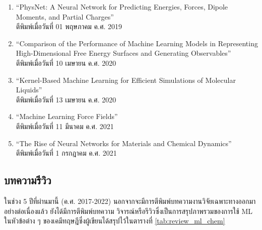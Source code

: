 \begin{enumerate}
    \item \enquote{PhysNet: A Neural Network for Predicting Energies, Forces, Dipole Moments, and 
    Partial Charges}\autocite{unke2019}\\
    ตีพิมพ์เมื่อวันที่ 01 พฤษภาคม ค.ศ. 2019
    
    \item \enquote{Comparison of the Performance of Machine Learning Models in Representing High-Dimensional 
    Free Energy Surfaces and Generating Observables}\autocite{cendagorta2020}\\
    ตีพิมพ์เมื่อวันที่ 10 เมษายน ค.ศ. 2020
    
    \item \enquote{Kernel-Based Machine Learning for Efficient Simulations of Molecular Liquids}\autocite{scherer2020}\\
    ตีพิมพ์เมื่อวันที่ 13 เมษายน ค.ศ. 2020

    \item \enquote{Machine Learning Force Fields}\autocite{unke2021}\\
    ตีพิมพ์เมื่อวันที่ 11 มีนาคม ค.ศ. 2021

    \item \enquote{The Rise of Neural Networks for Materials and Chemical Dynamics}\autocite{kulichenko2021}\\
    ตีพิมพ์เมื่อวันที่ 1 กรกฎาคม ค.ศ. 2021

\end{enumerate}

\subsection{บทความรีวิว}
\label{ssec:pred_misc_papers_review}

ในช่วง 5 ปีที่ผ่านมานี้ (ค.ศ. 2017-2022) นอกจากจะมีการตีพิมพ์บทความงานวิจัยเฉพาะทางออกมาอย่างต่อเนื่องแล้ว ยังได้มีการตีพิมพ์บทความ%
วิจารณ์หรือรีวิวซึ่งเป็นการสรุปภาพรวมของการใช้ ML ในหัวข้อต่าง ๆ ของเคมีทฤษฎีซึ่งผู้เขียนได้สรุปไว้ในตารางที่ \ref{tab:review_ml_chem}

